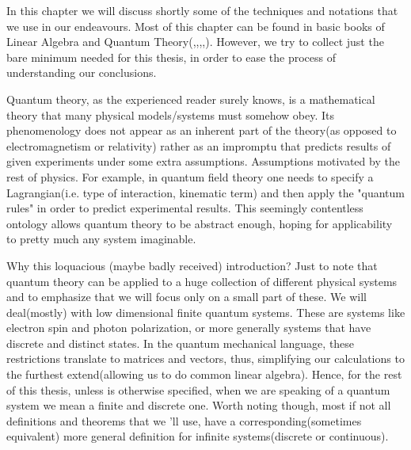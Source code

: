 \label{chap:1}
In this chapter we will discuss shortly some of the techniques and notations that we use in our endeavours. Most of this chapter can be found in basic books of Linear Algebra and Quantum Theory(\cite{nielsen2001separable},\cite{ballentine2014quantum},\cite{hall2013quantum},\cite{holevo2012quantum},\cite{wilde2013quantum}). However, we try to collect just the bare minimum needed for this thesis, in order to ease the process of understanding our conclusions.
\par
Quantum theory, as the experienced reader surely knows, is a mathematical theory that many physical models/systems must somehow obey. Its phenomenology does not appear as an inherent part of the theory(as opposed to electromagnetism or relativity) rather as an impromptu that predicts results of given experiments under some extra assumptions. Assumptions motivated by the rest of physics. For example, in quantum field theory one needs to specify a Lagrangian(i.e. type of interaction, kinematic term) and then apply the "quantum rules" in order to predict experimental results. This seemingly contentless ontology allows quantum theory to be abstract enough, hoping for applicability to pretty much any system imaginable.
\par
Why this loquacious (maybe badly received) introduction? Just to note that quantum theory can be applied to a huge collection of different physical systems and to emphasize that we will focus only on a small part of these. We will deal(mostly) with low dimensional finite quantum systems. These are systems like electron spin and photon polarization, or more generally systems that have discrete and distinct states. In the quantum mechanical language, these restrictions translate to matrices and vectors, thus, simplifying our calculations to the furthest extend(allowing us to do common linear algebra). Hence, for the rest of this thesis, unless is otherwise specified, when we are speaking of a quantum system we mean a finite and discrete one. Worth noting though, most if not all definitions and theorems that we 'll use, have a corresponding(sometimes equivalent) more general definition for infinite systems(discrete or continuous).
